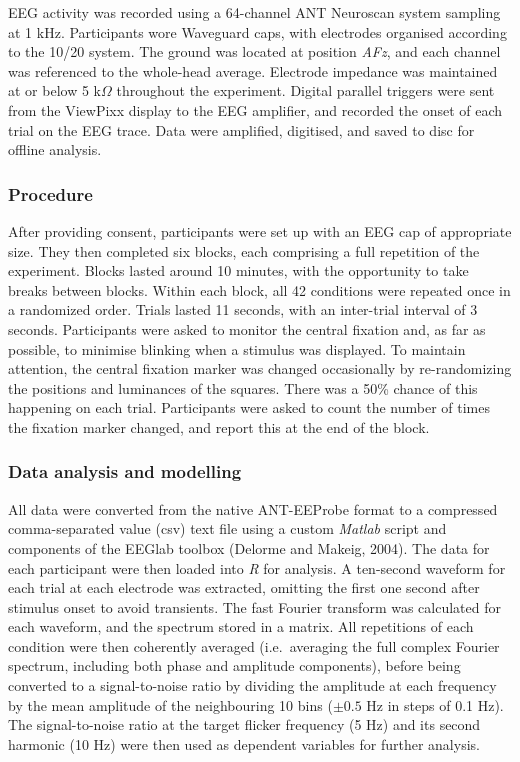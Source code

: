 \documentclass[]{article}
\begin{document}
EEG activity was recorded using a 64-channel ANT Neuroscan system sampling at 1 kHz. Participants wore Waveguard caps, with electrodes organised according to the 10/20 system. The ground was located at position \emph{AFz}, and each channel was referenced to the whole-head average. Electrode impedance was maintained at or below 5 k\(\Omega\) throughout the experiment. Digital parallel triggers were sent from the ViewPixx display to the EEG amplifier, and recorded the onset of each trial on the EEG trace. Data were amplified, digitised, and saved to disc for offline analysis.

\hypertarget{procedure}{%
\subsubsection{Procedure}\label{procedure}}

After providing consent, participants were set up with an EEG cap of appropriate size. They then completed six blocks, each comprising a full repetition of the experiment. Blocks lasted around 10 minutes, with the opportunity to take breaks between blocks. Within each block, all 42 conditions were repeated once in a randomized order. Trials lasted 11 seconds, with an inter-trial interval of 3 seconds. Participants were asked to monitor the central fixation and, as far as possible, to minimise blinking when a stimulus was displayed. To maintain attention, the central fixation marker was changed occasionally by re-randomizing the positions and luminances of the squares. There was a 50\% chance of this happening on each trial. Participants were asked to count the number of times the fixation marker changed, and report this at the end of the block.

\hypertarget{data-analysis-and-modelling}{%
\subsubsection{Data analysis and modelling}\label{data-analysis-and-modelling}}

All data were converted from the native ANT-EEProbe format to a compressed comma-separated value (csv) text file using a custom \emph{Matlab} script and components of the EEGlab toolbox (Delorme and Makeig, 2004). The data for each participant were then loaded into \emph{R} for analysis. A ten-second waveform for each trial at each electrode was extracted, omitting the first one second after stimulus onset to avoid transients. The fast Fourier transform was calculated for each waveform, and the spectrum stored in a matrix. All repetitions of each condition were then coherently averaged (i.e.~averaging the full complex Fourier spectrum, including both phase and amplitude components), before being converted to a signal-to-noise ratio by dividing the amplitude at each frequency by the mean amplitude of the neighbouring 10 bins (\(\pm0.5\) Hz in steps of 0.1 Hz). The signal-to-noise ratio at the target flicker frequency (5 Hz) and its second harmonic (10 Hz) were then used as dependent variables for further analysis.
\end{document}

